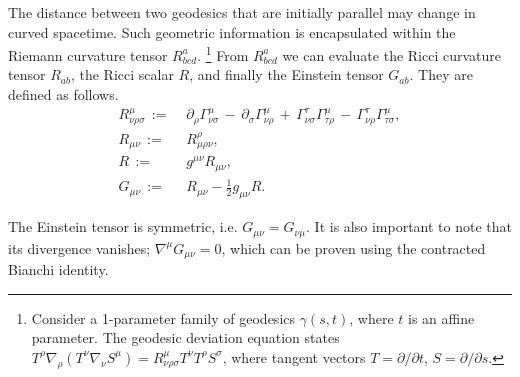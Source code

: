 The distance between two geodesics that are initially parallel may change in curved spacetime. Such geometric information is encapsulated within the Riemann curvature tensor $R^a_{bcd}$. \footnote{Consider a 1-parameter family of geodesics $\gamma(s,t)$, where $t$ is an affine parameter. The geodesic deviation equation states $T^\rho \nabla_\rho ( T^\nu \nabla_\nu S^\mu ) = R^\mu_{\nu\rho\sigma} T^\nu T^\rho S^\sigma$, where tangent vectors $T=\partial/\partial t$, $S=\partial/\partial s$.} From $R^a_{bcd}$ we can evaluate the Ricci curvature tensor $R_{ab}$, the Ricci scalar $R$, and finally the Einstein tensor $G_{ab}$. They are defined as follows.
\begin{align}
	R^\mu_{\nu\rho\sigma} \,:=& \,\, \partial_\rho \Gamma^\mu_{\nu\sigma} \,-\, \partial_\sigma \Gamma^\mu_{\nu\rho} \,+\, \Gamma^\tau_{\nu\sigma} \Gamma^\mu_{\tau\rho} \,-\, \Gamma^\tau_{\nu\rho} \Gamma^\mu_{\tau\sigma},  \label{def:Riemann_tensor}\\
	R_{\mu\nu} \,:=& \,\, R^\rho_{\mu\rho\nu},  \\ %
	R \,:=& \,\, g^{\mu\nu} R_{\mu\nu}, \\
	G_{\mu\nu} \,:=& \,\, R_{\mu\nu} - \frac{1}{2} g_{\mu\nu} R. \label{def:Einstein_tensor}
\end{align}

The Einstein tensor is symmetric, i.e. $G_{\mu\nu} = G_{\nu\mu}$. It is also important to note that its divergence vanishes; $\nabla^\mu G_{\mu\nu} = 0$, which can be proven using the contracted Bianchi identity.


